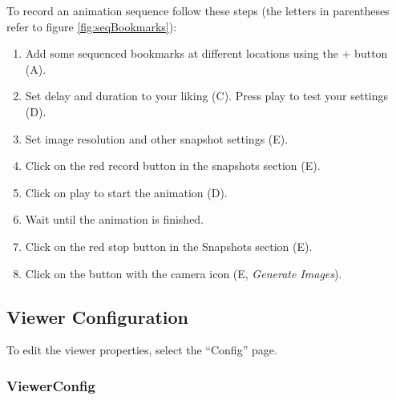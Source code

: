 To record an animation sequence follow these steps (the letters in parentheses refer to figure \ref{fig:seqBookmarks}):

\begin{enumerate}
	\item Add some sequenced bookmarks at different locations using the + button (A).
	\item Set delay and duration to your liking (C). Press play to test your settings (D).
	\item Set image resolution and other snapshot settings (E).
	\item Click on the red record button in the snapshots section (E).
	\item Click on play to start the animation (D).
	\item Wait until the animation is finished.
	\item Click on the red stop button in the Snapshots section (E).
	\item Click on the button with the camera icon (E, \emph{Generate Images}).
\end{enumerate}
\subsection{Viewer Configuration}
\label{sec:config}

To edit the viewer properties, select the ``Config'' page.

\subsubsection{ViewerConfig} 

